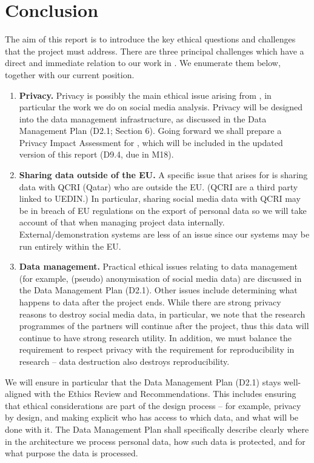 \section{Conclusion}
\label{sec:concl}

The aim of this report is to introduce the key ethical questions and challenges that the \project project must address.  There are three principal challenges which have a direct and immediate relation to our work in \project.  We enumerate them below, together with our current position.

\begin{enumerate}
    \item \textbf{Privacy.}  Privacy is possibly the main ethical issue arising from \project, in particular the work we do on social media analysis.  Privacy will be designed into the \project data management infrastructure, as discussed in the Data Management Plan (D2.1; Section 6).  Going forward we shall prepare a Privacy Impact Assessment for \project, which will be included in the updated version of this report (D9.4, due in M18).
    
    \item \textbf{Sharing data outside of the EU.} A specific issue that arises for \project is sharing data with QCRI (Qatar) who are outside the EU.  (QCRI are a third party linked to UEDIN.)  In particular, sharing social media data with QCRI may be in breach of EU regulations on the export of personal data so we will take account of that when managing project data internally.  External/demonstration systems are less of an issue since our systems may be run entirely within the EU.
    
    \item \textbf{Data management.}  Practical ethical issues relating to data management (for example, (pseudo) anonymisation of social media data) are discussed in the Data Management Plan (D2.1).  Other issues include determining what happens to data after the project ends.  While there are strong privacy reasons to destroy social media data, in particular, we note that the research programmes of the partners will continue after the project, thus this data will continue to have strong research utility.  In addition, we must balance the requirement to respect privacy with the requirement for reproducibility in research -- data destruction also destroys reproducibility.  
\end{enumerate}

We will ensure in particular that the \project Data Management Plan (D2.1) stays well-aligned with the Ethics Review and Recommendations. This includes ensuring that ethical considerations are part of the design process – for example, privacy by design, and making explicit who has access to which data, and what will be done with it. The Data Management Plan shall specifically describe clearly where in the \project architecture we process personal data, how such data is protected, and for what purpose the data is processed.

